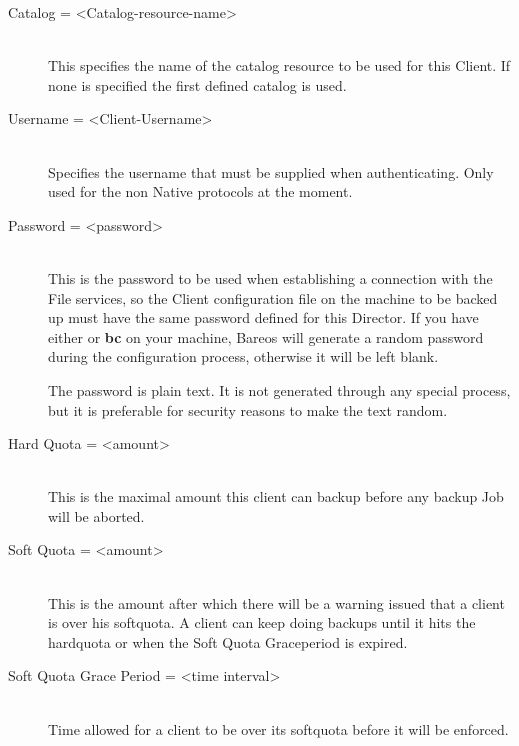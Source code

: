 \begin{description}
\item [Catalog = {\textless}Catalog-resource-name{\textgreater}] \hfill \\
This specifies the  name of the catalog resource to be used for this Client.
If none is specified the first defined catalog is used.

\item [Username = {\textless}Client-Username{\textgreater}] \hfill \\
Specifies the username that must be supplied when authenticating.
Only used for the non Native protocols at the moment.

\item [Password = {\textless}password{\textgreater}] \hfill \\
This is the password to be  used when establishing a connection with the File
services, so  the Client configuration file on the machine to be backed up
must  have the same password defined for this Director.
If you have either  or {\bf bc} on your machine,
Bareos will generate a random  password during the configuration process,
otherwise it will  be left blank.

The password is plain text.  It is not generated through any special
process, but it is preferable for security reasons to make the text
random.

\item [Hard Quota = {\textless}amount{\textgreater}] \hfill \\
This is the maximal amount this client can backup before any backup Job
will be aborted.

\item [Soft Quota = {\textless}amount{\textgreater}] \hfill \\
This is the amount after which there will be a warning issued that a client
is over his softquota. A client can keep doing backups until it hits the
hardquota or when the Soft Quota Graceperiod is expired.

\item [Soft Quota Grace Period = {\textless}time interval{\textgreater}] \hfill \\
Time allowed for a client to be over its softquota before it will be enforced.


\end{description}

